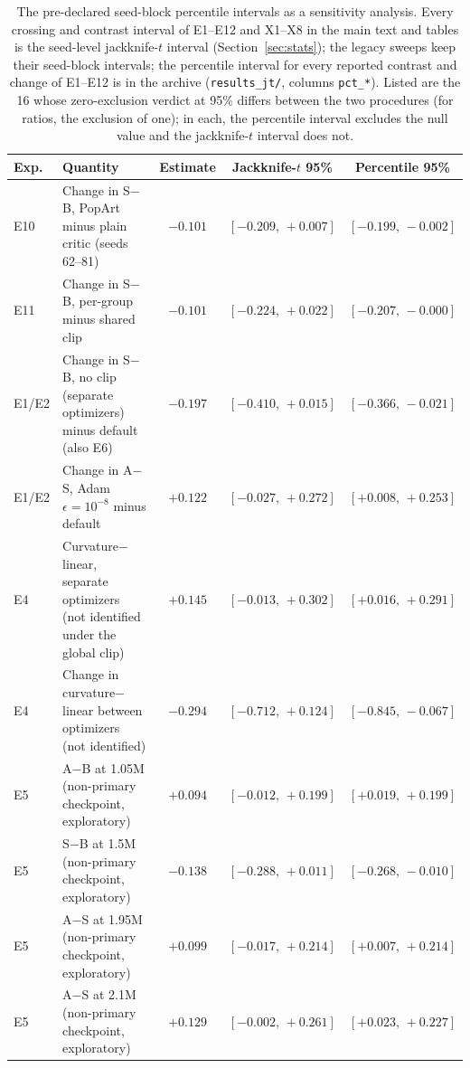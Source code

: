 \begin{table}[H]
\caption{The pre-declared seed-block percentile intervals as a sensitivity analysis. Every crossing and contrast interval of E1--E12 and X1--X8 in the main text and tables is the seed-level jackknife-$t$ interval (Section~\ref{sec:stats}); the legacy sweeps keep their seed-block intervals; the percentile interval for every reported contrast and change of E1--E12 is in the archive (\texttt{results\_jt/}, columns \texttt{pct\_*}). Listed are the 16 whose zero-exclusion verdict at 95\% differs between the two procedures (for ratios, the exclusion of one); in each, the percentile interval excludes the null value and the jackknife-$t$ interval does not.}
\label{tab:pct_sensitivity}
\centering\footnotesize
\begin{tabular}{@{}l>{\raggedright\arraybackslash}p{}ccc@{}}
\toprule
Exp. & Quantity & Estimate & Jackknife-$t$ 95\% & Percentile 95\% \\
\midrule
E10 & Change in S$-$B, PopArt minus plain critic (seeds 62--81) & $-0.101$ & $[-0.209,\,+0.007]$ & $[-0.199,\,-0.002]$ \\
E11 & Change in S$-$B, per-group minus shared clip & $-0.101$ & $[-0.224,\,+0.022]$ & $[-0.207,\,-0.000]$ \\
E1/E2 & Change in S$-$B, no clip (separate optimizers) minus default (also E6) & $-0.197$ & $[-0.410,\,+0.015]$ & $[-0.366,\,-0.021]$ \\
E1/E2 & Change in A$-$S, Adam $\epsilon{=}10^{-8}$ minus default & $+0.122$ & $[-0.027,\,+0.272]$ & $[+0.008,\,+0.253]$ \\
E4 & Curvature$-$linear, separate optimizers (not identified under the global clip) & $+0.145$ & $[-0.013,\,+0.302]$ & $[+0.016,\,+0.291]$ \\
E4 & Change in curvature$-$linear between optimizers (not identified) & $-0.294$ & $[-0.712,\,+0.124]$ & $[-0.845,\,-0.067]$ \\
E5 & A$-$B at 1.05M (non-primary checkpoint, exploratory) & $+0.094$ & $[-0.012,\,+0.199]$ & $[+0.019,\,+0.199]$ \\
E5 & S$-$B at 1.5M (non-primary checkpoint, exploratory) & $-0.138$ & $[-0.288,\,+0.011]$ & $[-0.268,\,-0.010]$ \\
E5 & A$-$S at 1.95M (non-primary checkpoint, exploratory) & $+0.099$ & $[-0.017,\,+0.214]$ & $[+0.007,\,+0.214]$ \\
E5 & A$-$S at 2.1M (non-primary checkpoint, exploratory) & $+0.129$ & $[-0.002,\,+0.261]$ & $[+0.023,\,+0.227]$ \\

\end{tabular}
\end{table}
